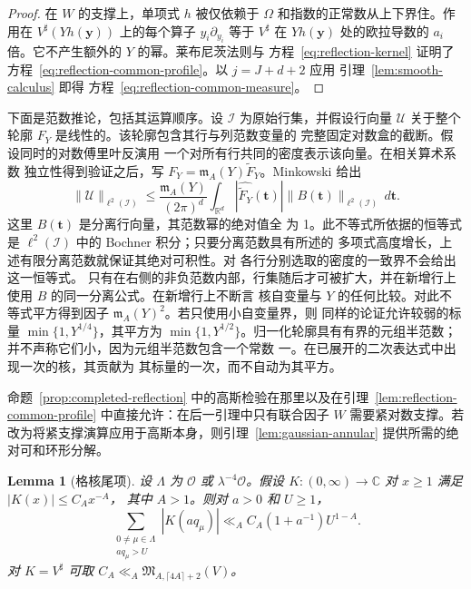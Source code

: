 \documentclass[11pt,a4paper]{article}
\numberwithin{equation}{section}
\numberwithin{figure}{section}
\newtheorem{lemma}[theorem]{Lemma}
\theoremstyle{definition}
\theoremstyle{remark}
\begin{document}
\begin{proof}
在 $W$ 的支撑上，单项式 $h$ 被仅依赖于 $\Omega$ 和指数的正常数从上下界住。作用在 $V^\sharp(Yh(\boldsymbol y))$ 上的每个算子 $y_i\partial_{y_i}$ 等于 $V^\sharp$ 在 $Yh(\boldsymbol y)$ 处的欧拉导数的 $a_i$ 倍。它不产生额外的 $Y$ 的幂。莱布尼茨法则与
方程~\eqref{eq:reflection-kernel} 证明了
方程~\eqref{eq:reflection-common-profile}。以 $j=J+d+2$ 应用
引理~\ref{lem:smooth-calculus} 即得
方程~\eqref{eq:reflection-common-measure}。
\end{proof}下面是范数推论，包括其运算顺序。设
$\mathcal I$ 为原始行集，并假设行向量 $\mathcal U$
关于整个轮廓 $F_Y$ 是线性的。该轮廓包含其行与列范数变量的
完整固定对数盒的截断。假设同时的对数傅里叶反演用
一个对所有行共同的密度表示该向量。在相关算术系数
独立性得到验证之后，写
$F_Y=\mathfrak m_A(Y)\widetilde F_Y$。Minkowski 给出
\begin{equation}\label{eq:reflection-common-minkowski}
 \|\mathcal U\|_{\ell^2(\mathcal I)}
 \le \frac{\mathfrak m_A(Y)}{(2\pi)^d}
       \int_{\mathbb R^d}|\widehat{\widetilde F_Y}(\boldsymbol t)|
       \|B(\boldsymbol t)\|_{\ell^2(\mathcal I)}\,d\boldsymbol t.
\end{equation}
这里 $B(\boldsymbol t)$ 是分离行向量，其范数幂的绝对值全
为 1。此不等式所依据的恒等式是 $\ell^2(\mathcal I)$ 中的
Bochner 积分；只要分离范数具有所述的
多项式高度增长，上述有限分离范数就保证其绝对可积性。对
各行分别选取的密度的一致界不会给出这一恒等式。
只有在右侧的非负范数内部，行集随后才可被扩大，并在新增行上
使用 $B$ 的同一分离公式。在新增行上不断言
核自变量与 $Y$ 的任何比较。对此不等式平方得到因子
$\mathfrak m_A(Y)^2$。若只使用小自变量界，则
同样的论证允许较弱的标量 $\min\{1,Y^{1/4}\}$，其平方为
$\min\{1,Y^{1/2}\}$。归一化轮廓具有有界的元组半范数；
并不声称它们小，因为元组半范数包含一个常数
一。在已展开的二次表达式中出现一次的核，其贡献为
其标量的一次，而不自动为其平方。

命题~\ref{prop:completed-reflection} 中的高斯检验在那里以及在引理~\ref{lem:reflection-common-profile} 中直接允许：在后一引理中只有联合因子 $W$ 需要紧对数支撑。若改为将紧支撑演算应用于高斯本身，则引理~\ref{lem:gaussian-annular} 提供所需的绝对可和环形分解。

\begin{lemma}[格核尾项]\label{lem:lattice-kernel-tail}
设 $\Lambda$ 为 $\mathcal O$ 或 $\lambda^{-4}\mathcal O$。假设
$K:(0,\infty)\to\mathbb C$ 对 $x\ge1$ 满足 $|K(x)|\le C_Ax^{-A}$，
其中 $A>1$。则对 $a>0$ 和 $U\ge1$，
\begin{equation}\label{eq:lattice-kernel-tail}
 \sum_{\substack{0\ne\mu\in\Lambda\\a q_\mu>U}}|K(aq_\mu)|
 \ll_A C_A(1+a^{-1})U^{1-A}.
\end{equation}
对 $K=V^\sharp$ 可取
$C_A\ll_A\mathfrak M_{A,\lceil4A\rceil+2}(V)$。
\end{lemma}
\end{document}
